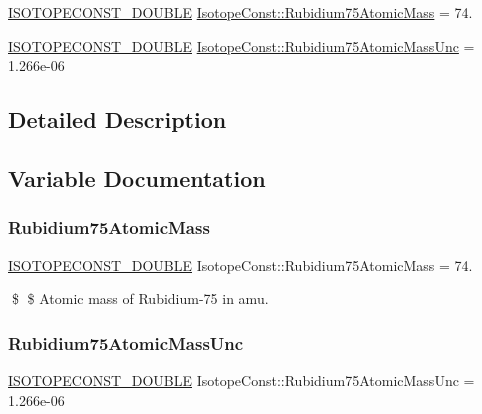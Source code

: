 \begin{DoxyCompactItemize}
\item 
\mbox{\hyperlink{group___isotope_const-_macros_ga8f45a7272ce02c0b4c65c44636ed719a}{I\+S\+O\+T\+O\+P\+E\+C\+O\+N\+S\+T\+\_\+\+D\+O\+U\+B\+LE}} \mbox{\hyperlink{group___isotope_const-_rubidium-_rb75_gadc27f5697ca8da5979e5c9c3b265b4cb}{Isotope\+Const\+::\+Rubidium75\+Atomic\+Mass}} = 74.
\item 
\mbox{\hyperlink{group___isotope_const-_macros_ga8f45a7272ce02c0b4c65c44636ed719a}{I\+S\+O\+T\+O\+P\+E\+C\+O\+N\+S\+T\+\_\+\+D\+O\+U\+B\+LE}} \mbox{\hyperlink{group___isotope_const-_rubidium-_rb75_gae9b14cc7a33ae64cc40b439f7fcc8862}{Isotope\+Const\+::\+Rubidium75\+Atomic\+Mass\+Unc}} = 1.\+266e-\/06
\end{DoxyCompactItemize}


\subsection{Detailed Description}


\subsection{Variable Documentation}
\mbox{\label{group___isotope_const-_rubidium-_rb75_gadc27f5697ca8da5979e5c9c3b265b4cb}} 
\subsubsection{\texorpdfstring{Rubidium75\+Atomic\+Mass}{Rubidium75AtomicMass}}
{\footnotesize\ttfamily \mbox{\hyperlink{group___isotope_const-_macros_ga8f45a7272ce02c0b4c65c44636ed719a}{I\+S\+O\+T\+O\+P\+E\+C\+O\+N\+S\+T\+\_\+\+D\+O\+U\+B\+LE}} Isotope\+Const\+::\+Rubidium75\+Atomic\+Mass = 74.}

\$ \$ Atomic mass of Rubidium-\/75 in amu. \mbox{\label{group___isotope_const-_rubidium-_rb75_gae9b14cc7a33ae64cc40b439f7fcc8862}} 
\subsubsection{\texorpdfstring{Rubidium75\+Atomic\+Mass\+Unc}{Rubidium75AtomicMassUnc}}
{\footnotesize\ttfamily \mbox{\hyperlink{group___isotope_const-_macros_ga8f45a7272ce02c0b4c65c44636ed719a}{I\+S\+O\+T\+O\+P\+E\+C\+O\+N\+S\+T\+\_\+\+D\+O\+U\+B\+LE}} Isotope\+Const\+::\+Rubidium75\+Atomic\+Mass\+Unc = 1.\+266e-\/06}


